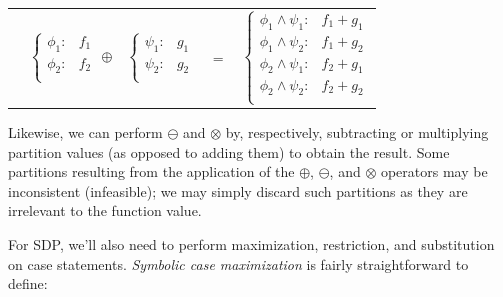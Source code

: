\documentclass[letterpaper]{article}
\begin{document}
{\footnotesize 
\begin{center}
\begin{tabular}{r c c c l}
&
\hspace{-6mm} 
  $\begin{cases}
    \phi_1: & f_1 \\ 
    \phi_2: & f_2 \\ 
  \end{cases}$
$\oplus$
&
\hspace{-4mm}
  $\begin{cases}
    \psi_1: & g_1 \\ 
    \psi_2: & g_2 \\ 
  \end{cases}$
&
\hspace{-2mm} 
$ = $
&
\hspace{-2mm}
  $\begin{cases}
  \phi_1 \wedge \psi_1: & f_1 + g_1 \\ 
  \phi_1 \wedge \psi_2: & f_1 + g_2 \\ 
  \phi_2 \wedge \psi_1: & f_2 + g_1 \\ 
  \phi_2 \wedge \psi_2: & f_2 + g_2 \\ 
  \end{cases}$
\end{tabular}
\end{center}
}
\normalsize

Likewise, we can perform $\ominus$ and $\otimes$ by,
respectively, subtracting or multiplying partition values (as opposed
to adding them) to obtain the result.  Some partitions resulting from
the application of the $\oplus$, $\ominus$, and $\otimes$ operators
may be inconsistent (infeasible); we may simply discard such 
partitions as they are irrelevant to the function value.

For SDP, we'll also need to perform maximization, restriction,
and substitution on case statements.  
\emph{Symbolic case maximization} is fairly straightforward
to define:
\vspace{-5mm}
\end{document}
